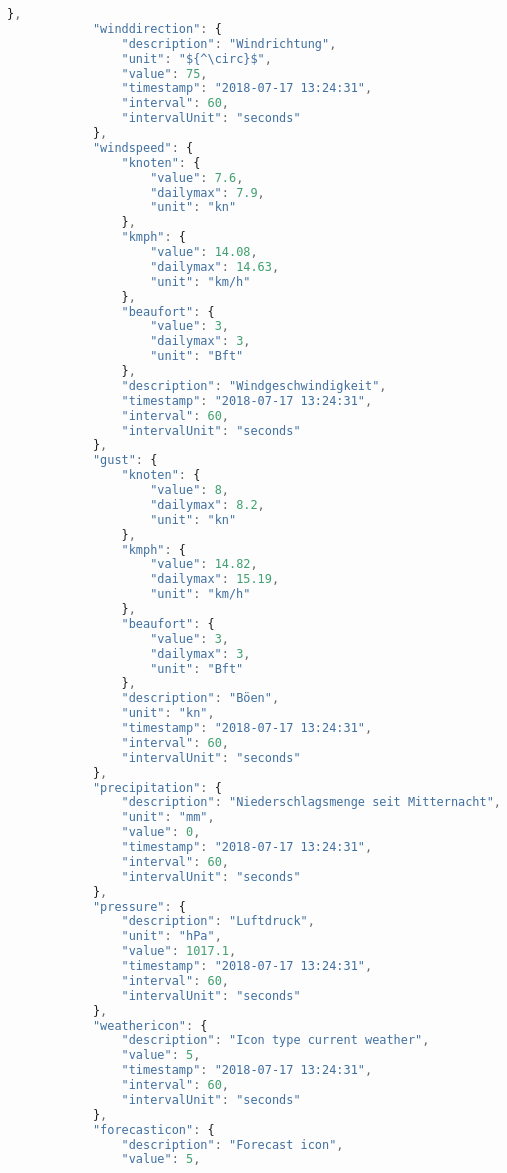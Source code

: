 \begin{lstlisting}[label=lst:JsonTree,caption=Json Struktur, language=JavaScript, style=htmlcssjs, mathescape]
            },
            "winddirection": {
                "description": "Windrichtung",
                "unit": "${^\circ}$",
                "value": 75,
                "timestamp": "2018-07-17 13:24:31",
                "interval": 60,
                "intervalUnit": "seconds"
            },
            "windspeed": {
                "knoten": {
                    "value": 7.6,
                    "dailymax": 7.9,
                    "unit": "kn"
                },
                "kmph": {
                    "value": 14.08,
                    "dailymax": 14.63,
                    "unit": "km/h"
                },
                "beaufort": {
                    "value": 3,
                    "dailymax": 3,
                    "unit": "Bft"
                },
                "description": "Windgeschwindigkeit",
                "timestamp": "2018-07-17 13:24:31",
                "interval": 60,
                "intervalUnit": "seconds"
            },
            "gust": {
                "knoten": {
                    "value": 8,
                    "dailymax": 8.2,
                    "unit": "kn"
                },
                "kmph": {
                    "value": 14.82,
                    "dailymax": 15.19,
                    "unit": "km/h"
                },
                "beaufort": {
                    "value": 3,
                    "dailymax": 3,
                    "unit": "Bft"
                },
                "description": "Böen",
                "unit": "kn",
                "timestamp": "2018-07-17 13:24:31",
                "interval": 60,
                "intervalUnit": "seconds"
            },
            "precipitation": {
                "description": "Niederschlagsmenge seit Mitternacht",
                "unit": "mm",
                "value": 0,
                "timestamp": "2018-07-17 13:24:31",
                "interval": 60,
                "intervalUnit": "seconds"
            },
            "pressure": {
                "description": "Luftdruck",
                "unit": "hPa",
                "value": 1017.1,
                "timestamp": "2018-07-17 13:24:31",
                "interval": 60,
                "intervalUnit": "seconds"
            },
            "weathericon": {
                "description": "Icon type current weather",
                "value": 5,
                "timestamp": "2018-07-17 13:24:31",
                "interval": 60,
                "intervalUnit": "seconds"
            },
            "forecasticon": {
                "description": "Forecast icon",
                "value": 5,

\end{lstlisting}
